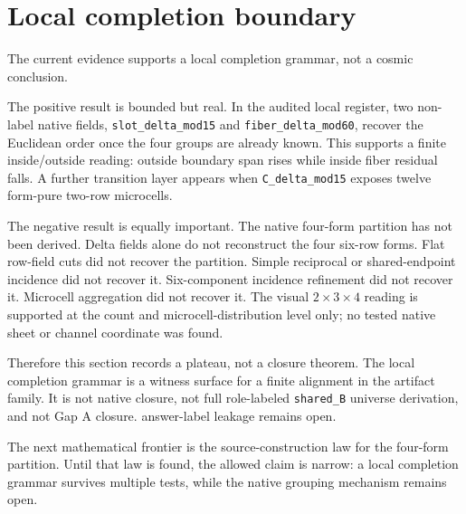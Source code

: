 \section{Local completion boundary}

The current evidence supports a local completion grammar, not a cosmic conclusion.

The positive result is bounded but real. In the audited local register, two non-label native fields, \texttt{slot\_delta\_mod15} and \texttt{fiber\_delta\_mod60}, recover the Euclidean order once the four groups are already known. This supports a finite inside/outside reading: outside boundary span rises while inside fiber residual falls. A further transition layer appears when \texttt{C\_delta\_mod15} exposes twelve form-pure two-row microcells.

The negative result is equally important. The native four-form partition has not been derived. Delta fields alone do not reconstruct the four six-row forms. Flat row-field cuts did not recover the partition. Simple reciprocal or shared-endpoint incidence did not recover it. Six-component incidence refinement did not recover it. Microcell aggregation did not recover it. The visual \(2 \times 3 \times 4\) reading is supported at the count and microcell-distribution level only; no tested native sheet or channel coordinate was found.

Therefore this section records a plateau, not a closure theorem. The local completion grammar is a witness surface for a finite alignment in the artifact family. It is not native closure, not full role-labeled \texttt{shared\_B} universe derivation, and not Gap A closure. answer-label leakage remains open.

The next mathematical frontier is the source-construction law for the four-form partition. Until that law is found, the allowed claim is narrow: a local completion grammar survives multiple tests, while the native grouping mechanism remains open.

